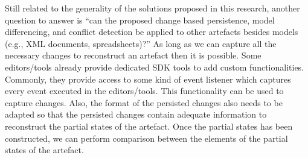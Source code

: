 Still related to the generality of the solutions proposed in this research, another question to answer is ``can the proposed change based persistence, model differencing, and conflict detection be applied to other artefacts besides models (e.g., XML documents, spreadsheets)?'' As long as we can capture all the necessary changes to reconstruct an artefact then it is possible. Some editors/tools already provide dedicated SDK tools to add custom functionalities. Commonly, they provide access to some kind of event listener which captures every event executed in the editors/tools. This functionality can be used to capture changes. Also, the format of the persisted changes also needs to be adapted so that the persisted changes contain adequate information to reconstruct the partial states of the artefact. Once the partial states has been constructed, we can perform comparison between the elements of the partial states of the artefact.